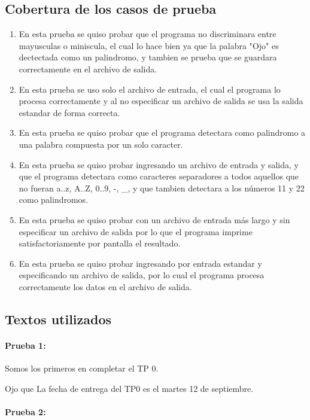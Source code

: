 \documentclass[a4paper]{article}
\begin{document}
\subsection{Cobertura de los casos de prueba}
\begin{enumerate}
\item En esta prueba se quiso probar que el programa no discriminara entre mayusculas o miniscula, el cual lo hace bien ya que la palabra "Ojo" es dectectada como un palindromo, y tambien se prueba que se guardara correctamente en el archivo de salida.
\item En esta prueba se uso solo el archivo de entrada, el cual el programa lo procesa correctamente  y al no especificar un archivo de salida se usa la salida estandar de forma correcta. 
\item En esta prueba se quiso probar que el programa detectara como palindromo a una palabra compuesta por un solo caracter.
\item En esta prueba se quiso probar ingresando un archivo de entrada y salida, y que el programa detectara como caracteres separadores a todos aquellos que no fueran a..z, A..Z, 0..9, -, _, y que tambien detectara a los números 11 y 22 como palindromos.
\item En esta prueba se quiso probar con un archivo de entrada más largo y sin especificar un archivo de salida por lo que el programa imprime satisfactoriamente por pantalla el resultado.
\item En esta prueba se quiso probar ingresando por entrada estandar y especificando un archivo de salida, por lo cual el programa procesa correctamente los datos en el archivo de salida.
\end{enumerate}

\pagebreak
\subsection{Textos utilizados}

\paragraph{Prueba 1:}

Somos los primeros en completar el TP 0.

Ojo que La fecha de entrega del TP0 es el martes 12 de septiembre.

\paragraph{Prueba 2:}
\end{document}
